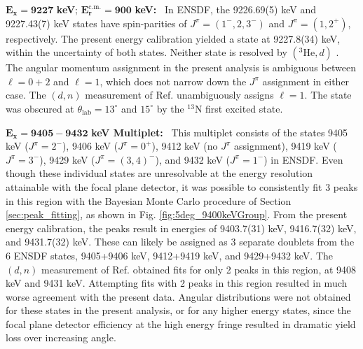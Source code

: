 \emph{$\mathbf{E_{x} = 9227}$} \textbf{keV}; \emph{$\mathbf{E^{\boldsymbol{\mathrm{c.m.}}}_{r} = 900}$} \textbf{keV:} \, 
In ENSDF, the 9226.69(5) keV and 9227.43(7) keV states have spin-parities of $J^{\pi} = (1^{-},2,3^{-})$ and $J^{\pi} = (1,2^{+})$, respectively. The present energy calibration yielded a state at 9227.8(34) keV, within the uncertainty of both states. Neither state is resolved by $(^{3}\mathrm{He},d)$ \cite{Erskine1966,Seth1967,Cage1971}. The angular momentum assignment in the present analysis is ambiguous between $\ell=0+2$ and $\ell=1$, which does not narrow down the $J^{\pi}$ assignment in either case. The $(d,n)$ measurement of Ref. \cite{Fuchs1969} unambiguously assigns $\ell=1$. The state was obscured at $\theta_{\mathrm{lab}} = 13^{\circ}$ and $15^{\circ}$ by the $^{13}$N first excited state.

\emph{$\mathbf{E_{x} = 9405-9432}$} \textbf{keV Multiplet:} \, 
This multiplet consists of the states 9405 keV ($J^{\pi} = 2^{-}$), 9406 keV ($J^{\pi} = 0^{+}$), 9412 keV (no $J^{\pi}$ assignment), 9419 keV ($J^{\pi} = 3^{-}$), 9429 keV ($J^{\pi} = (3,4)^{-}$), and 9432 keV ($J^{\pi} = 1^{-}$) in ENSDF. Even though these individual states are unresolvable at the energy resolution attainable with the focal plane detector, it was possible to consistently fit 3 peaks in this region with the Bayesian Monte Carlo procedure of Section \ref{sec:peak_fitting}, as shown in Fig. \ref{fig:5deg_9400keVGroup}. From the present energy calibration, the peaks result in energies of 9403.7(31) keV, 9416.7(32) keV, and 9431.7(32) keV. These can likely be assigned as 3 separate doublets from the 6 ENSDF states, 9405+9406 keV, 9412+9419 keV, and 9429+9432 keV. The $(d,n)$ measurement of Ref. \cite{Fuchs1969} obtained fits for only 2 peaks in this region, at 9408 keV and 9431 keV. Attempting fits with 2 peaks in this region resulted in much worse agreement with the present data. Angular distributions were not obtained for these states in the present analysis, or for any higher energy states, since the focal plane detector efficiency at the high energy fringe resulted in dramatic yield loss over increasing angle.

